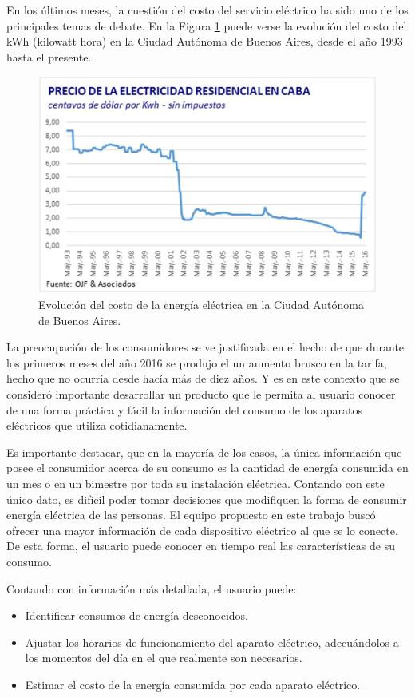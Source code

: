 En los últimos meses, la cuestión del costo del servicio eléctrico ha sido uno de los principales temas de debate. En la Figura \ref{fig:costo_caba} puede verse la evolución del costo del kWh (kilowatt hora) en la Ciudad Autónoma de Buenos Aires, desde el año 1993 hasta el presente.

\begin{figure}[h]
	\centering
	\includegraphics[width=12cm]{./Figures/1_1_costo_electricidad_caba.png}
	\caption{Evolución del costo de la energía eléctrica en la Ciudad Autónoma de Buenos Aires.}
	\label{fig:costo_caba}
\end{figure}

La preocupación de los consumidores se ve justificada en el hecho de que durante los primeros meses del año 2016 se produjo el un aumento brusco en la tarifa, hecho que no ocurría desde hacía más de diez años. Y es en este contexto que se consideró importante desarrollar un producto que le permita al usuario conocer de una forma práctica y fácil la información del consumo de los aparatos eléctricos que utiliza cotidianamente. 

Es importante destacar, que en la mayoría de los casos, la única información que posee el consumidor acerca de su consumo es la cantidad de energía consumida en un mes o en un bimestre por toda su instalación eléctrica. Contando con este único dato, es difícil poder tomar decisiones que modifiquen la forma de consumir energía eléctrica de las personas. El equipo propuesto en este trabajo buscó ofrecer una mayor información de cada dispositivo eléctrico al que se lo conecte. De esta forma, el usuario puede conocer en tiempo real las características de su consumo.

Contando con información más detallada, el usuario puede:
\begin{itemize}
\item Identificar consumos de energía desconocidos.
\item Ajustar los horarios de funcionamiento del aparato eléctrico, adecuándolos a los momentos del día en el que realmente son necesarios.
\item Estimar el costo de la energía consumida por cada aparato eléctrico.
\end{itemize}

